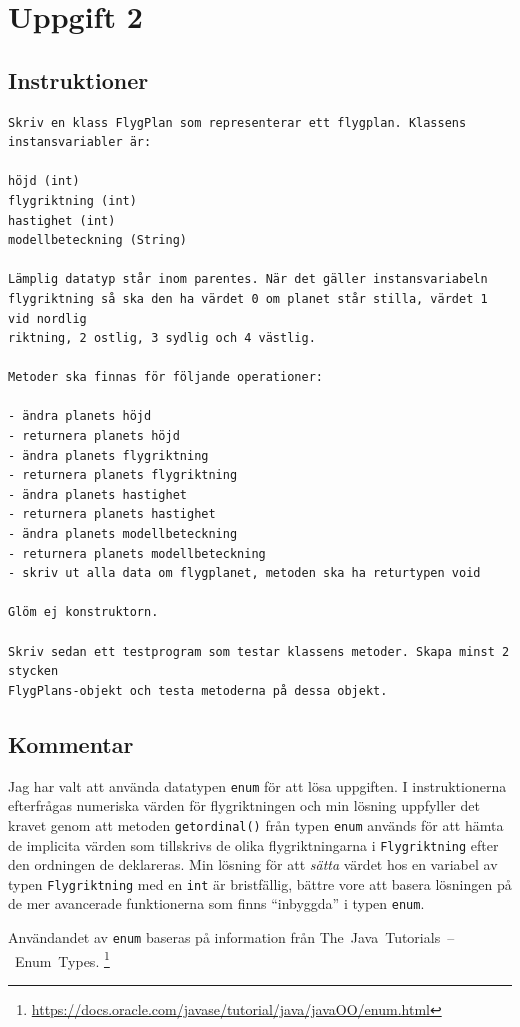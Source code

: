 \section{Uppgift 2}\label{sec:uppg02}

\subsection{Instruktioner}
\begin{Verbatim}[fontsize=\small]
Skriv en klass FlygPlan som representerar ett flygplan. Klassens
instansvariabler är:

höjd (int)
flygriktning (int)
hastighet (int)
modellbeteckning (String)

Lämplig datatyp står inom parentes. När det gäller instansvariabeln
flygriktning så ska den ha värdet 0 om planet står stilla, värdet 1 vid nordlig
riktning, 2 ostlig, 3 sydlig och 4 västlig.

Metoder ska finnas för följande operationer:

- ändra planets höjd
- returnera planets höjd
- ändra planets flygriktning
- returnera planets flygriktning
- ändra planets hastighet
- returnera planets hastighet
- ändra planets modellbeteckning
- returnera planets modellbeteckning
- skriv ut alla data om flygplanet, metoden ska ha returtypen void

Glöm ej konstruktorn.

Skriv sedan ett testprogram som testar klassens metoder. Skapa minst 2 stycken
FlygPlans-objekt och testa metoderna på dessa objekt.
\end{Verbatim}


\subsection{Kommentar}
Jag har valt att använda datatypen \texttt{enum} för att lösa uppgiften.  I
instruktionerna efterfrågas numeriska värden för flygriktningen och min lösning
uppfyller det kravet genom att metoden \texttt{getordinal()} från typen
\texttt{enum} används för att hämta de implicita värden som tillskrivs de olika
flygriktningarna i \texttt{Flygriktning} efter den ordningen de deklareras.
Min lösning för att \emph{sätta} värdet hos en variabel av typen
\texttt{Flygriktning} med en \texttt{int} är bristfällig, bättre vore att
basera lösningen på de mer avancerade funktionerna som finns ``inbyggda'' i
typen \texttt{enum}.

Användandet av \texttt{enum} baseras på information från
\mbox{The Java Tutorials -- Enum Types}.
\footnote{\url{https://docs.oracle.com/javase/tutorial/java/javaOO/enum.html}}


